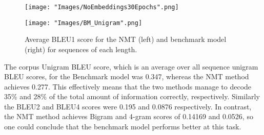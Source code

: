 \documentclass[]{article}
\begin{document}
\begin{figure}[h]
	\centering
	\begin{minipage}[b]{0.48\textwidth}
		\texttt{[image: "Images/NoEmbeddings30Epochs".png]}
	\end{minipage}
	\begin{minipage}[b]{0.48\textwidth}
		\texttt{[image: "Images/BM\_Unigram".png]}
	\end{minipage}
	\caption{Average BLEU1 score for the NMT (left) and benchmark model (right) for sequences of each length.}
	\label{fig:per_sequence}
\end{figure}
The corpus Unigram BLEU score, which is an average over all sequence unigram BLEU scores, for the Benchmark model was 0.347, whereas the NMT method achieves 0.277. This effectively means that the two methods manage to decode 35\% and 28\% of the total amount of information correctly, respectively. Similarly the BLEU2 and BLEU4 scores were 0.195 and 0.0876 respectively. In contrast, the NMT method achieves Bigram and 4-gram scores of 0.14169 and 0.0526, so one could conclude that the benchmark model performs better at this task.
\end{document}
